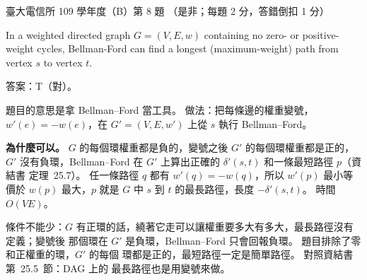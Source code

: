 \begin{pastexam}[label={px:ntu-109-comm-dsa-08}]{臺大電信所 109 學年度（B）第 8 題}
（是非；每題 2 分，答錯倒扣 1 分）

In a weighted directed graph $G=(V,E,w)$ containing no zero- or positive-weight cycles,
Bellman-Ford can find a longest (maximum-weight) path from vertex $s$ to vertex $t$.
\end{pastexam}

\begin{pastsoln}
答案：T（對）。

題目的意思是拿 Bellman--Ford 當工具。 做法：把每條邊的權重變號，$w'(e) = -w(e)$，在
$G' = (V, E, w')$ 上從 $s$ 執行 Bellman--Ford。

\textbf{為什麼可以。} $G$ 的每個環權重都是負的，變號之後 $G'$ 的每個環權重都是正的，$G'$
沒有負環，Bellman--Ford 在 $G'$ 上算出正確的 $\delta'(s, t)$ 和一條最短路徑 $p$（資結書
定理~25.7）。 任一條路徑 $q$ 都有 $w'(q) = -w(q)$，所以 $w'(p)$ 最小等價於 $w(p)$ 最大，$p$
就是 $G$ 中 $s$ 到 $t$ 的最長路徑，長度 $-\delta'(s, t)$。 時間 $O(VE)$。

條件不能少：$G$ 有正環的話，繞著它走可以讓權重要多大有多大，最長路徑沒有定義；變號後
那個環在 $G'$ 是負環，Bellman--Ford 只會回報負環。 題目排除了零和正權重的環，$G'$ 的每個
環都是正的，最短路徑一定是簡單路徑。 對照資結書第~25.5~節：DAG 上的
最長路徑也是用變號來做。
\end{pastsoln}
